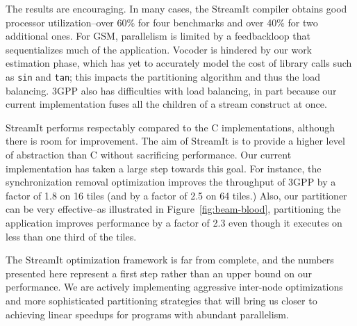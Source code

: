 The results are encouraging.  In many cases, the StreamIt compiler
obtains good processor utilization--over 60\% for four benchmarks and
over 40\% for two additional ones.  For GSM, parallelism is limited by
a feedbackloop that sequentializes much of the application.  Vocoder
is hindered by our work estimation phase, which has yet to accurately
model the cost of library calls such as {\tt sin} and {\tt tan}; this
impacts the partitioning algorithm and thus the load balancing.  3GPP
also has difficulties with load balancing, in part because our current
implementation fuses all the children of a stream construct at once.

StreamIt performs respectably compared to the C implementations,
although there is room for improvement.  The aim of StreamIt is to
provide a higher level of abstraction than C without sacrificing
performance.  Our current implementation has taken a large step
towards this goal.  For instance, the synchronization removal
optimization improves the throughput of 3GPP by a factor of 1.8 on 16
tiles (and by a factor of 2.5 on 64 tiles.)  Also, our partitioner can
be very effective--as illustrated in Figure~\ref{fig:beam-blood},
partitioning the \Radar~ application improves performance by a factor
of 2.3 even though it executes on less than one third of the tiles.

The StreamIt optimization framework is far from complete, and the
numbers presented here represent a first step rather than an upper
bound on our performance.  We are actively implementing aggressive
inter-node optimizations and more sophisticated partitioning
strategies that will bring us closer to achieving linear speedups for
programs with abundant parallelism.




